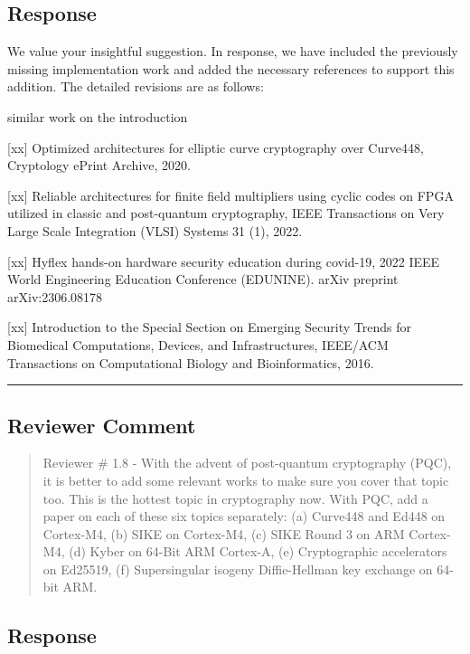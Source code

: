 \subsection{Response}

We value your insightful suggestion. In response, we have included the previously missing implementation work and added the necessary references to support this addition. The detailed revisions are as follows:

\color{blue}

similar work on the introduction

	[xx] Optimized architectures for elliptic curve cryptography over Curve448, Cryptology ePrint Archive, 2020.

	[xx] Reliable architectures for finite field multipliers using cyclic codes on FPGA utilized in classic and post-quantum cryptography, IEEE Transactions on Very Large Scale Integration (VLSI) Systems 31 (1), 2022.

	[xx] Hyflex hands-on hardware security education during covid-19, 2022 IEEE World Engineering Education Conference (EDUNINE).
arXiv preprint arXiv:2306.08178

[xx] Introduction to the Special Section on Emerging Security Trends for Biomedical Computations, Devices, and Infrastructures, IEEE/ACM Transactions on Computational Biology and Bioinformatics, 2016.


\color{black}


\noindent\rule{\linewidth}{2.0pt}

\subsection{Reviewer Comment}
\begin{mdframed}
	\begin{quote}
		Reviewer \# 1.8 - With the advent of post-quantum cryptography (PQC), it is better to add some relevant works to make sure you cover that topic too. This is the hottest topic in cryptography now. With PQC, add a paper on each of these six topics separately: (a) Curve448 and Ed448 on Cortex-M4, (b) SIKE on Cortex-M4, (c) SIKE Round 3 on ARM Cortex-M4, (d) Kyber on 64-Bit ARM Cortex-A, (e) Cryptographic accelerators on Ed25519, (f) Supersingular isogeny Diffie-Hellman key exchange on 64-bit ARM.
	\end{quote}
\end{mdframed}

\subsection{Response}

